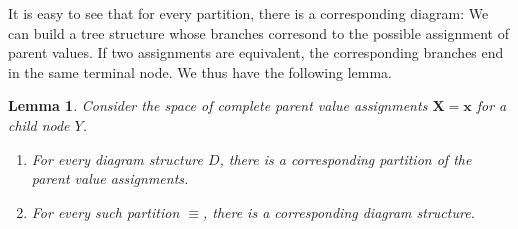 \documentclass{elsarticle}%
\newtheorem{lemma}[theorem]{Lemma}
\newcommand{\X}{X}
\newcommand{\Y}{Y}
\newcommand{\tree}{D}
\newcommand{\partition}{\equiv}
\newcommand{\parentval}{x}
\newcommand{\parentvals}{\mathbf{\parentval}}
\newcommand{\childvar}{\Y}
\newcommand{\parentvar}{\X}
\newcommand{\parentvars}{\mathbf{\parentvar}}
\begin{document}

It is easy to see that for every partition, there is a corresponding diagram: We can build a tree structure whose branches corresond to the possible assignment of parent values. If two assignments are equivalent, the corresponding branches end in the same terminal node. We thus have the following lemma.
% 

 

\begin{lemma} \label{lemma:refine}
Consider the space of complete parent value assignments $\parentvars= \parentvals$ for a child node $\childvar$. 

\begin{enumerate}
\item For every diagram structure $\tree$, there is a corresponding partition of the parent value assignments.
\item For every such partition $\partition$, there is a corresponding diagram structure.
\end{enumerate}
\end{lemma}
\end{document}
